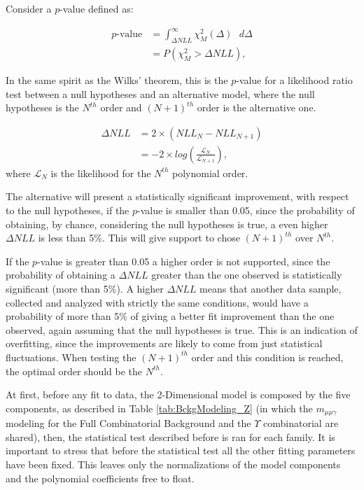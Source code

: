 Consider a $p$-value defined as: 

\begin{equation}
\label{eqn:p-value_f_test}
\begin{split}
 p\text{-value} & = \int^{\infty}_{\Delta NLL} \chi^2_M(\Delta) \text{ } d\Delta\\
& = P(\chi^2_M > \Delta NLL)  ,
\end{split}
\end{equation}

In the same spirit as the Wilks' theorem, this is the $p$-value for a likelihood ratio test between a null hypotheses and an alternative model, where the null hypotheses is the $N^{th}$ order and $(N+1)^{th}$ order is the alternative one.

\begin{equation}
\label{eqn:likehood_ratio}
\begin{split}
 \Delta NLL & = 2 \times (NLL_{N} - NLL_{N+1}) \\
  & = -2 \times log(\frac{\mathcal{L}_N}{\mathcal{L}_{N+1}}),
\end{split}
\end{equation}
where $\mathcal{L}_N$ is the likelihood for the $N^{th}$ polynomial order.

The alternative will present a statistically significant improvement, with respect to the null hypotheses, if the $p$-value is smaller than 0.05, since the probability of obtaining, by chance, considering the null hypotheses is true, a even higher $\Delta NLL$ is less than 5\%. This will give support to chose $(N+1)^{th}$ over $N^{th}$.

If the $p$-value is greater than 0.05 a higher order is not supported, since the probability of obtaining a $\Delta NLL$ greater than the one observed is statistically significant (more than 5\%). A higher $\Delta NLL$ means that another data sample, collected and analyzed with strictly the same conditions, would have a probability of more than 5\% of giving a better fit improvement than the one observed, again assuming that the null hypotheses is true. This is an indication of overfitting, since the improvements are likely to come from just statistical fluctuations. When testing the $(N+1)^{th}$ order and this condition is reached, the optimal order should be the $N^{th}$.

At first, before any fit to data, the 2-Dimensional model is composed by the five components, as described in Table \ref{tab:BckgModeling_Z} (in which the $m_{\mu\mu\gamma}$ modeling for the Full Combinatorial Background and the $\Upsilon$ combinatorial are shared), then, the statistical test described before is ran for each family. It is important to stress that before the statistical test all the other fitting parameters have been fixed. This leaves only the normalizations of the model components and the polynomial coefficients free to float.

